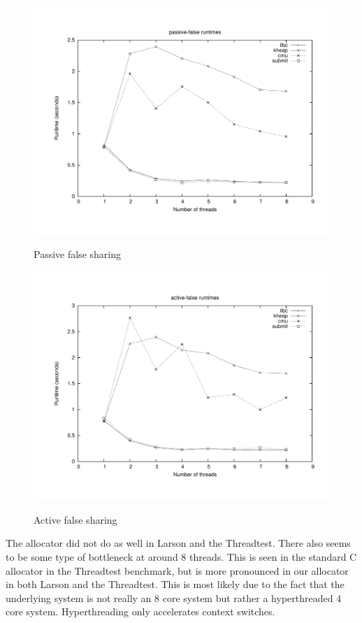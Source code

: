 \documentclass[oneside]{amsart}
\theoremstyle{definition}
\theoremstyle{remark}
\numberwithin{equation}{section}
\begin{document}
\begin{figure}[h]
    \caption{Passive false sharing}
    \centering
    \includegraphics[scale=0.35]{../benchmarks/cache-scratch/cache-scratch.pdf}
    \label{fig:plot}
\end{figure}

\begin{figure}[h]
    \caption{Active false sharing}
    \centering
    \includegraphics[scale=0.35]{../benchmarks/cache-thrash/cache-thrash.pdf}
    \label{fig:plot}
\end{figure}

\newpage 

The allocator did not do as well in Larson and the Threadtest. There also seems to be some type of
bottleneck at around 8 threads. This is seen in the standard C allocator in the Threadtest
benchmark, but is more pronounced in our allocator in both Larson and the Threadtest. This is most
likely due to the fact that the underlying system is not really an 8 core system but rather a
hyperthreaded 4 core system. Hyperthreading only accelerates context switches.
\end{document}
